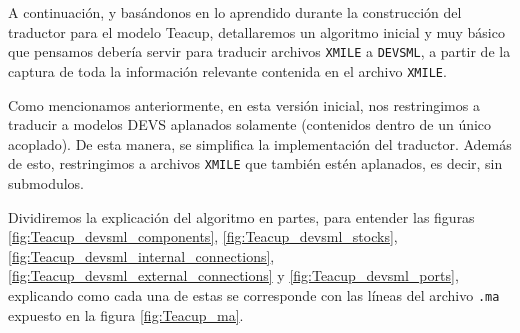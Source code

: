 A continuación, y basándonos en lo aprendido durante la construcción del traductor para el modelo Teacup, detallaremos un algoritmo inicial y muy básico que pensamos debería servir para traducir archivos \texttt{XMILE} a \texttt{DEVSML}, a partir de la captura de toda la información relevante contenida en el archivo \texttt{XMILE}.

Como mencionamos anteriormente, en esta versión inicial, nos restringimos a traducir a modelos DEVS aplanados solamente (contenidos dentro de un único acoplado). De esta manera, se simplifica la implementación del traductor. Además de esto, restringimos a archivos \texttt{XMILE} que también estén aplanados, es decir, sin submodulos.

Dividiremos la explicación del algoritmo en partes, para entender las figuras \ref{fig:Teacup_devsml_components}, \ref{fig:Teacup_devsml_stocks}, \ref{fig:Teacup_devsml_internal_connections}, \ref{fig:Teacup_devsml_external_connections} y \ref{fig:Teacup_devsml_ports}, explicando como cada una de estas se corresponde con las líneas del archivo \texttt{.ma} expuesto en la figura \ref{fig:Teacup_ma}.

